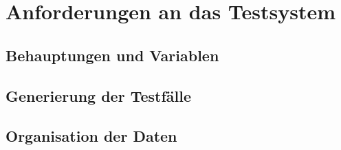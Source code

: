 \section{Anforderungen an das Testsystem}
\label{sec:evaluationPlan}

\subsection{Behauptungen und Variablen}
\label{sec:predictions}



\subsection{Generierung der Testfälle}
\label{sec:testcaseGeneration}



\subsection{Organisation der Daten}
\label{sec:dataOrganisation}

